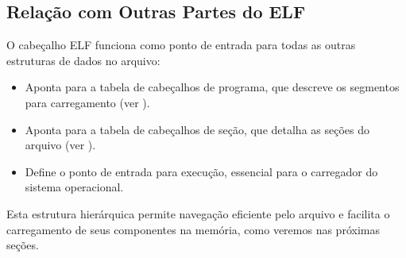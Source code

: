 \subsection{Relação com Outras Partes do ELF}\label{subsec:elf_header_relation}

O cabeçalho ELF funciona como ponto de entrada para todas as outras estruturas de dados no arquivo:

\begin{itemize}
    \item Aponta para a tabela de cabeçalhos de programa, que descreve os segmentos para carregamento (ver ).
    \item Aponta para a tabela de cabeçalhos de seção, que detalha as seções do arquivo (ver ).
    \item Define o ponto de entrada para execução, essencial para o carregador do sistema operacional.
\end{itemize}

Esta estrutura hierárquica permite navegação eficiente pelo arquivo e facilita o carregamento de seus componentes na memória, como veremos nas próximas seções.